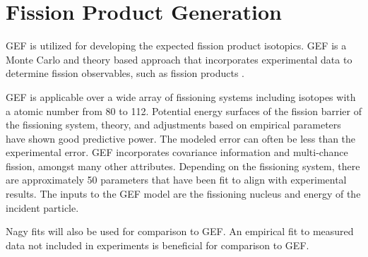 \section{Fission Product Generation}

GEF is utilized for developing the expected fission product isotopics. 
GEF is a Monte Carlo and theory based approach that incorporates experimental data to determine fission observables, such as fission products \cite{Schmidt2016}. 

GEF is applicable over a wide array of fissioning systems including isotopes with a atomic number from 80 to 112\cite{Schmidt2015}. 
Potential energy surfaces of the fission barrier of the fissioning system, theory, and adjustments based on empirical parameters have shown good predictive power\cite{Schmidt2014}. 
The modeled error can often be less than the experimental error. 
GEF incorporates covariance information and multi-chance fission, amongst many other attributes. 
Depending on the fissioning system, there are approximately 50 parameters that have been fit to align with experimental results. 
The inputs to the GEF model are the fissioning nucleus and energy of the incident particle. 

Nagy fits will also be used for comparison to GEF. 
An empirical fit to measured data not included in experiments is beneficial for comparison to GEF. %

